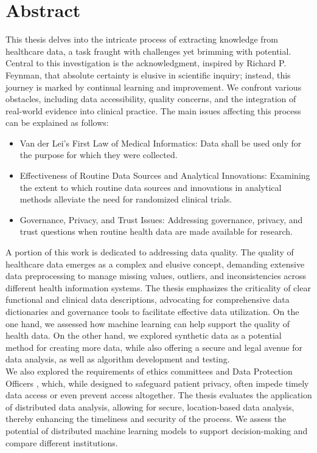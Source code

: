 \chapter*{Abstract}


This thesis delves into the intricate process of extracting knowledge from healthcare data, a task fraught with challenges yet brimming with potential. Central to this investigation is the acknowledgment, inspired by Richard P. Feynman, that absolute certainty is elusive in scientific inquiry; instead, this journey is marked by continual learning and improvement. We confront various obstacles, including data accessibility, quality concerns, and the integration of real-world evidence into clinical practice. The main issues affecting this process can be explained as follows:

\begin{itemize}
    \item Van der Lei’s First Law of Medical Informatics: Data shall be used only for the purpose for which they were collected.
    \item Effectiveness of Routine Data Sources and Analytical Innovations: Examining the extent to which routine data sources and innovations in analytical methods alleviate the need for randomized clinical trials.
    \item Governance, Privacy, and Trust Issues: Addressing governance, privacy, and trust questions when routine health data are made available for research.

\end{itemize}

A portion of this work is dedicated to addressing data quality. The quality of healthcare data emerges as a complex and elusive concept, demanding extensive data preprocessing to manage missing values, outliers, and inconsistencies across different health information systems. The thesis emphasizes the criticality of clear functional and clinical data descriptions, advocating for comprehensive data dictionaries and governance tools to facilitate effective data utilization. On the one hand, we assessed how machine learning can help support the quality of health data. On the other hand, we explored synthetic data as a potential method for creating more data, while also offering a secure and legal avenue for data analysis, as well as algorithm development and testing. \\

We also explored the requirements of ethics committees and Data Protection Officers , which, while designed to safeguard patient privacy, often impede timely data access or even prevent access altogether. The thesis evaluates the application of distributed data analysis, allowing for secure, location-based data analysis, thereby enhancing the timeliness and security of the process. We assess the potential of distributed machine learning models to support decision-making and compare different institutions. \\

